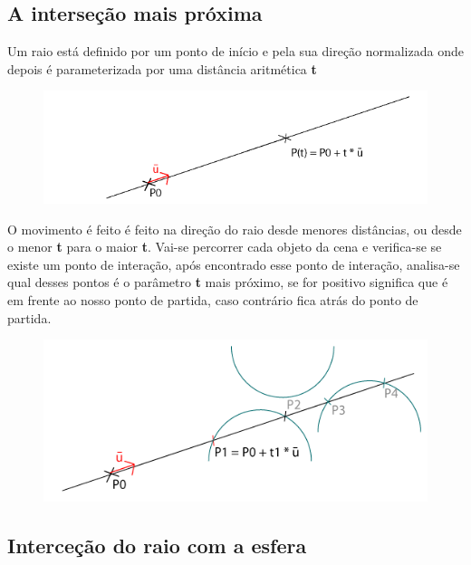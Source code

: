 \documentclass[12pt]{article}
\begin{document}
\subsection{A interseção mais próxima}
\vspace{5 mm}
\hspace{8 mm}Um raio está definido por um ponto de início e pela sua direção normalizada onde depois é parameterizada por uma distância aritmética \textbf{t}

\begin{figure}[!h]
\centering
\includegraphics[scale=0.4]{img0.png}
\label{img0}
\end{figure}

O movimento é feito é feito na direção do raio desde menores distâncias, ou desde o menor \textbf{t} para o maior \textbf{t}. Vai-se percorrer cada objeto da cena e verifica-se se existe um ponto de interação, após encontrado esse ponto de interação, analisa-se qual desses pontos é o parâmetro \textbf{t} mais próximo, se for positivo significa que é em frente ao nosso ponto de partida, caso contrário fica atrás do ponto de partida.

\begin{figure}[!h]
\centering
\includegraphics[scale=0.6]{img1.png}
\label{img1}
\end{figure}

\subsection{Interceção do raio com a esfera}
\vspace{5 mm}
\hspace{8 mm}
\end{document}

